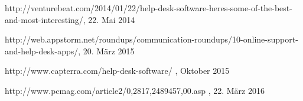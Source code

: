 \noindent
http://venturebeat.com/2014/01/22/help-desk-software-heres-some-of-the-best-and-most-interesting/, 22. Mai 2014

\noindent
http://web.appstorm.net/roundups/communication-roundups/10-online-support-and-help-desk-apps/, 20. März 2015

\noindent
http://www.capterra.com/help-desk-software/ , Oktober 2015

\noindent
http://www.pcmag.com/article2/0,2817,2489457,00.asp , 22. März 2016
